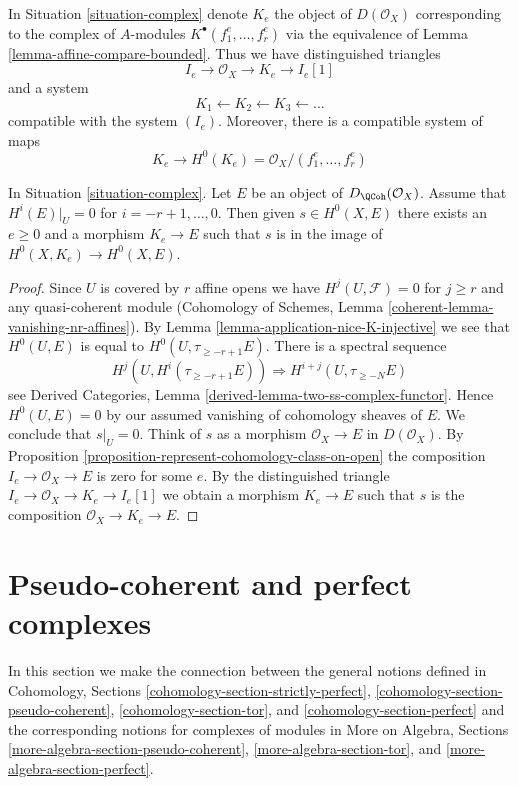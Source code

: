 \noindent
In Situation \ref{situation-complex} denote $K_e$ the object of
$D(\mathcal{O}_X)$ corresponding to the complex of $A$-modules
$K^\bullet(f_1^e, \ldots, f_r^e)$ via the equivalence of
Lemma \ref{lemma-affine-compare-bounded}. Thus we have distinguished
triangles
$$
I_e \to \mathcal{O}_X \to K_e \to I_e[1]
$$
and a system
$$
K_1 \leftarrow
K_2 \leftarrow
K_3 \leftarrow \ldots
$$
compatible with the system $(I_e)$.
Moreover, there is a compatible system of maps
$$
K_e \to H^0(K_e) = \mathcal{O}_X/(f_1^e, \ldots, f_r^e)
$$

\begin{lemma}
\label{lemma-represent-cohomology-class-on-closed}
In Situation \ref{situation-complex}. Let $E$ be an object of
$D_\QCoh(\mathcal{O}_X)$.
Assume that $H^i(E)|_U = 0$ for $i = - r + 1, \ldots, 0$.
Then given $s \in H^0(X, E)$ there exists an $e \geq 0$ and
a morphism $K_e \to E$ such that $s$ is in the image of
$H^0(X, K_e) \to H^0(X, E)$.
\end{lemma}

\begin{proof}
Since $U$ is covered by $r$ affine opens we have $H^j(U, \mathcal{F}) = 0$
for $j \geq r$ and any quasi-coherent module
(Cohomology of Schemes, Lemma \ref{coherent-lemma-vanishing-nr-affines}).
By Lemma \ref{lemma-application-nice-K-injective} we see that $H^0(U, E)$
is equal to $H^0(U, \tau_{\geq -r + 1}E)$. There is
a spectral sequence
$$
H^j(U, H^i(\tau_{\geq -r + 1}E)) \Rightarrow H^{i + j}(U, \tau_{\geq -N}E)
$$
see Derived Categories, Lemma \ref{derived-lemma-two-ss-complex-functor}.
Hence $H^0(U, E) = 0$ by our assumed vanishing of cohomology sheaves of $E$.
We conclude that $s|_U = 0$.
Think of $s$ as a morphism $\mathcal{O}_X \to E$ in $D(\mathcal{O}_X)$.
By Proposition \ref{proposition-represent-cohomology-class-on-open}
the composition $I_e \to \mathcal{O}_X \to E$ is zero for some $e$.
By the distinguished triangle $I_e \to \mathcal{O}_X \to K_e \to I_e[1]$
we obtain a morphism $K_e \to E$ such that $s$ is the composition
$\mathcal{O}_X \to K_e \to E$.
\end{proof}


\section{Pseudo-coherent and perfect complexes}
\label{section-spell-out}

\noindent
In this section we make the connection between the general
notions defined in
Cohomology, Sections \ref{cohomology-section-strictly-perfect},
\ref{cohomology-section-pseudo-coherent},
\ref{cohomology-section-tor}, and
\ref{cohomology-section-perfect}
and the corresponding notions for complexes of modules in
More on Algebra, Sections
\ref{more-algebra-section-pseudo-coherent},
\ref{more-algebra-section-tor}, and
\ref{more-algebra-section-perfect}.

